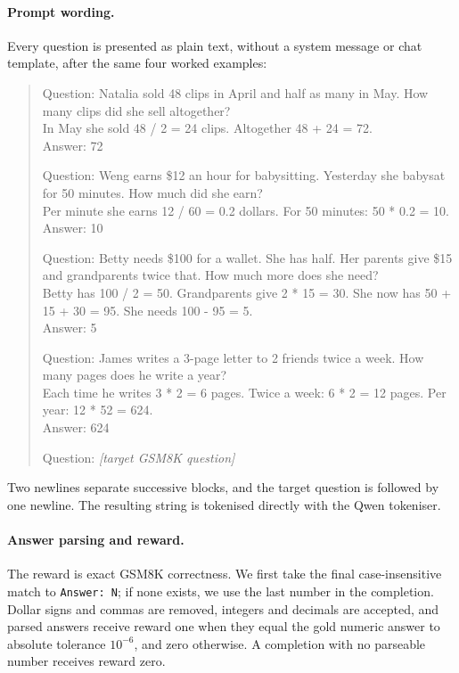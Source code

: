 \paragraph{Prompt wording.}
Every question is presented as plain text, without a system message or chat
template, after the same four worked examples:
\begin{quote}\small
Question: Natalia sold 48 clips in April and half as many in May. How many
clips did she sell altogether?\\
In May she sold 48 / 2 = 24 clips. Altogether 48 + 24 = 72.\\
Answer: 72

\medskip
Question: Weng earns \$12 an hour for babysitting. Yesterday she babysat for
50 minutes. How much did she earn?\\
Per minute she earns 12 / 60 = 0.2 dollars. For 50 minutes: 50 * 0.2 = 10.\\
Answer: 10

\medskip
Question: Betty needs \$100 for a wallet. She has half. Her parents give
\$15 and grandparents twice that. How much more does she need?\\
Betty has 100 / 2 = 50. Grandparents give 2 * 15 = 30. She now has
50 + 15 + 30 = 95. She needs 100 - 95 = 5.\\
Answer: 5

\medskip
Question: James writes a 3-page letter to 2 friends twice a week. How many
pages does he write a year?\\
Each time he writes 3 * 2 = 6 pages. Twice a week: 6 * 2 = 12 pages.
Per year: 12 * 52 = 624.\\
Answer: 624

\medskip
Question: \emph{[target GSM8K question]}
\end{quote}
Two newlines separate successive blocks, and the target question is followed
by one newline.  The resulting string is tokenised directly with the Qwen
tokeniser.

\paragraph{Answer parsing and reward.}
The reward is exact GSM8K correctness.  We first take the final
case-insensitive match to \texttt{Answer: N}; if none exists, we use the last
number in the completion.  Dollar signs and commas are removed, integers and
decimals are accepted, and parsed answers receive reward one when they equal
the gold numeric answer to absolute tolerance $10^{-6}$, and zero otherwise.
A completion with no parseable number receives reward zero.

